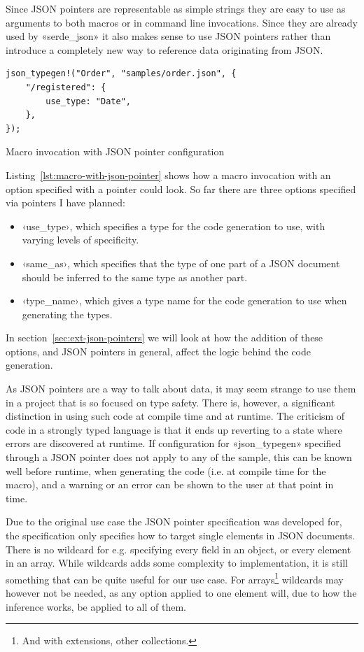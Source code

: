 Since JSON pointers are representable as simple strings they are easy to use as arguments to both macros or in command line invocations. Since they are already used by «serde_json» it also makes sense to use JSON pointers rather than introduce a completely new way to reference data originating from JSON.

\begin{listing}[ht!]
\begin{verbatim}
json_typegen!("Order", "samples/order.json", {
    "/registered": {
        use_type: "Date",
    },
});
\end{verbatim}
\caption{Macro invocation with JSON pointer configuration}
\label{lst:macro-with-json-pointer}
\end{listing}

Listing~\ref{lst:macro-with-json-pointer} shows how a macro invocation with an option specified with a pointer could look. So far there are three options specified via pointers I have planned:

\begin{itemize}
  \item ‹use_type›, which specifies a type for the code generation to use, with varying levels of specificity.
  \item ‹same_as›, which specifies that the type of one part of a JSON document should be inferred to the same type as another part.
  \item ‹type_name›, which gives a type name for the code generation to use when generating the types.
\end{itemize}

In section~\ref{sec:ext-json-pointers} we will look at how the addition of these options, and JSON pointers in general, affect the logic behind the code generation.

As JSON pointers are a  way to talk about data, it may seem strange to use them in a project that is so focused on type safety. There is, however, a significant distinction in using such code at compile time and at runtime. The criticism of  code in a strongly typed language is that it ends up reverting to a state where errors are discovered at runtime. If configuration for «json_typegen» specified through a JSON pointer does not apply to any of the sample, this can be known well before runtime, when generating the code (i.e. at compile time for the macro), and a warning or an error can be shown to the user at that point in time.

Due to the original use case the JSON pointer specification was developed for, the specification only specifies how to target single elements in JSON documents. There is no wildcard for e.g. specifying every field in an object, or every element in an array. While wildcards adds some complexity to implementation, it is still something that can be quite useful for our use case. For arrays\footnote{And with extensions, other collections.} wildcards may however not be needed, as any option applied to one element will, due to how the inference works, be applied to all of them.

